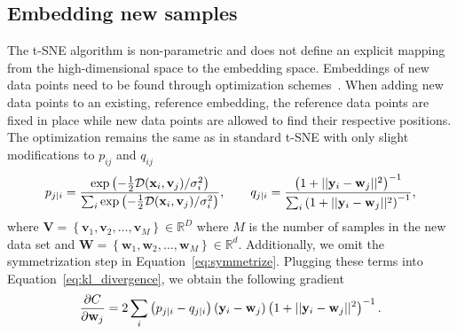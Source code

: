 \documentclass[article]{jss}
\begin{document}
\subsection{Embedding new samples} \label{sec:meth.transform}

The t-SNE algorithm is non-parametric and does not define an explicit mapping from the
high-dimensional space to the embedding space. Embeddings of new data
points need to be found through optimization
schemes~\citep{policar2021embedding}. When adding new data points to an
existing, reference embedding, the reference data points are fixed in place
while new data points are allowed to find their respective positions. The
optimization remains the same as in standard t-SNE with only slight
modifications to $p_{ij}$ and $q_{ij}$
\begin{align}
p_{j \mid i} = \frac{\exp \left ( -\frac{1}{2} \mathcal{D}(\mathbf{x}_i, \mathbf{v}_j) /  \sigma_i^2 \right )}{\sum_{i} \exp \left ( -\frac{1}{2} \mathcal{D}(\mathbf{x}_i, \mathbf{v}_j) / \sigma_i^2 \right )}, \qquad
q_{j \mid i} = \frac{\left ( 1 + || \mathbf{y}_i - \mathbf{w}_j ||^2 \right )^{-1}}{\sum_{i}\left ( 1 + || \mathbf{y}_i - \mathbf{w}_j ||^2 \right )^{-1}}, \notag
\end{align}
\noindent where $\mathbf{V} = \left \{ \mathbf{v}_1, \mathbf{v}_2, \dots,
\mathbf{v}_M \right \} \in \mathbb{R}^D$ where $M$ is the number of samples in
the new data set and $\mathbf{W} = \left \{ \mathbf{w}_1, \mathbf{w}_2, \dots,
\mathbf{w}_M \right \} \in \mathbb{R}^d$. Additionally, we omit the
symmetrization step in Equation~\ref{eq:symmetrize}. Plugging these terms into
Equation~\ref{eq:kl_divergence}, we obtain the following gradient
\begin{equation}
\frac{\partial C}{\partial \mathbf{w}_j} = 2 \sum_i \left ( p_{j \mid i} - q_{j \mid i} \right ) \left ( \mathbf{y}_i - \mathbf{w}_j \right ) \left ( 1 + || \mathbf{y}_i - \mathbf{w}_j || ^2 \right )^{-1}. \notag
\label{eq:gradient}
\end{equation}
\end{document}
